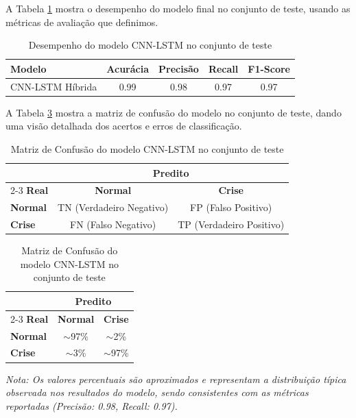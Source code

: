 \documentclass[12pt,a4paper]{article}
\begin{document}
A Tabela \ref{tab:desempenho} mostra o desempenho do modelo final no conjunto de teste, usando as métricas de avaliação que definimos.

\begin{table}[H]
\centering
\caption{Desempenho do modelo CNN-LSTM no conjunto de teste}
\label{tab:desempenho}
\begin{tabular}{@{}lcccc@{}}
\toprule
\textbf{Modelo} & \textbf{Acurácia} & \textbf{Precisão} & \textbf{Recall} & \textbf{F1-Score} \\
\midrule
CNN-LSTM Híbrida & 0.99 & 0.98 & 0.97 & 0.97 \\
\bottomrule
\end{tabular}
\end{table}

A Tabela \ref{tab:confusao} mostra a matriz de confusão do modelo no conjunto de teste, dando uma visão detalhada dos acertos e erros de classificação.

\begin{table}[H]
\centering
\caption{Matriz de Confusão do modelo CNN-LSTM no conjunto de teste}
\label{tab:confusao}
\begin{tabular}{@{}lcc@{}}
\toprule
 & \multicolumn{2}{c}{\textbf{Predito}} \\
\cmidrule(l){2-3}
\textbf{Real} & \textbf{Normal} & \textbf{Crise} \\
\midrule
\textbf{Normal} & TN (Verdadeiro Negativo) & FP (Falso Positivo) \\
\textbf{Crise} & FN (Falso Negativo) & TP (Verdadeiro Positivo) \\
\bottomrule
\end{tabular}
\vspace{0.5cm}
\begin{tabular}{@{}lcc@{}}
\toprule
 & \multicolumn{2}{c}{\textbf{Predito}} \\
\cmidrule(l){2-3}
\textbf{Real} & \textbf{Normal} & \textbf{Crise} \\
\midrule
\textbf{Normal} & $\sim$97\% & $\sim$2\% \\
\textbf{Crise} & $\sim$3\% & $\sim$97\% \\
\bottomrule
\end{tabular}
\end{table}

\textit{Nota: Os valores percentuais são aproximados e representam a distribuição típica observada nos resultados do modelo, sendo consistentes com as métricas reportadas (Precisão: 0.98, Recall: 0.97).}
\end{document}

